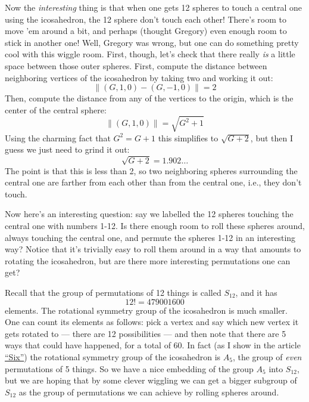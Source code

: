 \documentclass{article}
\begin{document}
Now the \emph{interesting} thing is that when one gets 12 spheres to
touch a central one using the icosahedron, the 12 sphere don't touch
each other! There's room to move 'em around a bit, and perhaps (thought
Gregory) even enough room to stick in another one! Well, Gregory was
wrong, but one can do something pretty cool with this wiggle room.
First, though, let's check that there really \emph{is} a little space
between those outer spheres. First, compute the distance between
neighboring vertices of the icosahedron by taking two and working it
out: \[\|(G,1,0) -(G,-1,0)\| = 2\] Then, compute the distance from any
of the vertices to the origin, which is the center of the central
sphere: \[\|(G,1,0)\| = \sqrt{G^2 + 1}\] Using the charming fact that
\(G^2 = G + 1\) this simplifies to \(\sqrt{G + 2}\), but then I guess we
just need to grind it out: \[\sqrt{G + 2} =  1.902\ldots\] The point is
that this is less than 2, so two neighboring spheres surrounding the
central one are farther from each other than from the central one, i.e.,
they don't touch.

Now here's an interesting question: say we labelled the 12 spheres
touching the central one with numbers 1-12. Is there enough room to roll
these spheres around, always touching the central one, and permute the
spheres 1-12 in an interesting way? Notice that it's trivially easy to
roll them around in a way that amounts to rotating the icosahedron, but
are there more interesting permutations one can get?

Recall that the group of permutations of 12 things is called \(S_{12}\),
and it has \[12! = 479001600\] elements. The rotational symmetry group
of the icosahedron is much smaller. One can count its elements as
follows: pick a vertex and say which new vertex it gets rotated to ---
there are 12 possibilities --- and then note that there are 5 ways that
could have happened, for a total of 60. In fact (as I show in the
article \href{http://math.ucr.edu/home/baez/six.html}{``Six''}) the
rotational symmetry group of the icosahedron is \(A_5\), the group of
\emph{even} permutations of 5 things. So we have a nice embedding of the
group \(A_5\) into \(S_{12}\), but we are hoping that by some clever
wiggling we can get a bigger subgroup of \(S_{12}\) as the group of
permutations we can achieve by rolling spheres around.
\end{document}
